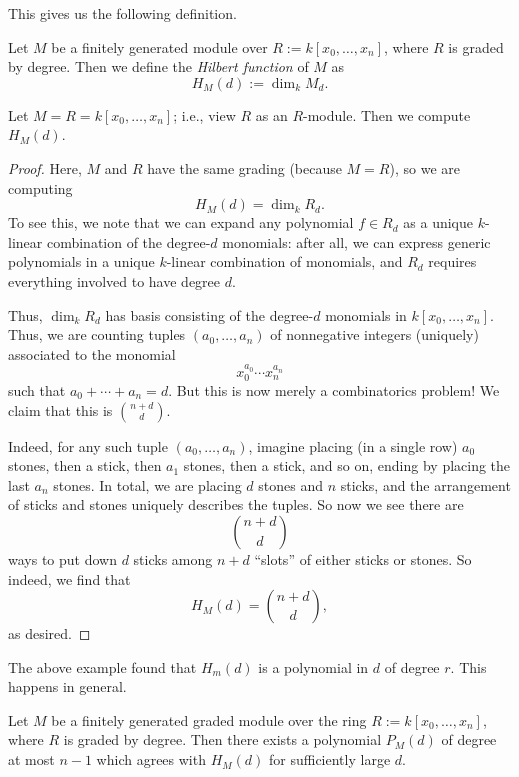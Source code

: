 This gives us the following definition.
\begin{definition}
	Let $M$ be a finitely generated module over $R:=k[x_0,\ldots,x_n]$, where $R$ is graded by degree. Then we define the \textit{Hilbert function} of $M$ as
	\[H_M(d):=\dim_kM_d.\]
\end{definition}
\begin{exe} \label{exe:hilbfuncex}
	Let $M=R=k[x_0,\ldots,x_n]$; i.e., view $R$ as an $R$-module. Then we compute $H_M(d)$.
\end{exe}
\begin{proof}
	Here, $M$ and $R$ have the same grading (because $M=R$), so we are computing
	\[H_M(d)=\dim_kR_d.\]
	To see this, we note that we can expand any polynomial $f\in R_d$ as a unique $k$-linear combination of the degree-$d$ monomials: after all, we can express generic polynomials in a unique $k$-linear combination of monomials, and $R_d$ requires everything involved to have degree $d$.

	Thus, $\dim_kR_d$ has basis consisting of the degree-$d$ monomials in $k[x_0,\ldots,x_n]$. Thus, we are counting tuples $(a_0,\ldots,a_n)$ of nonnegative integers (uniquely) associated to the monomial
	\[x_0^{a_0}\cdots x_n^{a_n}\]
	such that $a_0+\cdots+a_n=d$. But this is now merely a combinatorics problem! We claim that this is $\binom{n+d}d$.
	
	Indeed, for any such tuple $(a_0,\ldots,a_n)$, imagine placing (in a single row) $a_0$ stones, then a stick, then $a_1$ stones, then a stick, and so on, ending by placing the last $a_n$ stones. In total, we are placing $d$ stones and $n$ sticks, and the arrangement of sticks and stones uniquely describes the tuples. So now we see there are
	\[\binom{n+d}d\]
	ways to put down $d$ sticks among $n+d$ ``slots'' of either sticks or stones. So indeed, we find that
	\[\boxed{H_M(d)=\binom{n+d}d},\]
	as desired.
\end{proof}
The above example found that $H_m(d)$ is a polynomial in $d$ of degree $r$. This happens in general.
\begin{theorem} \label{thm:hilbertpoly}
	Let $M$ be a finitely generated graded module over the ring $R:=k[x_0,\ldots,x_n]$, where $R$ is graded by degree. Then there exists a polynomial $P_M(d)$ of degree at most $n-1$ which agrees with $H_M(d)$ for sufficiently large $d$.
\end{theorem}
